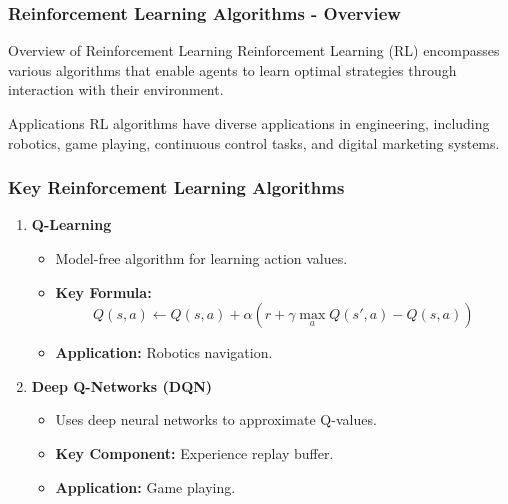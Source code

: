 \documentclass[aspectratio=169]{beamer}
\begin{document}
\begin{frame}[fragile]
    \frametitle{Reinforcement Learning Algorithms - Overview}
    \begin{block}{Overview of Reinforcement Learning}
        Reinforcement Learning (RL) encompasses various algorithms that enable agents to learn optimal strategies through interaction with their environment.
    \end{block}
    \begin{block}{Applications}
        RL algorithms have diverse applications in engineering, including robotics, game playing, continuous control tasks, and digital marketing systems.
    \end{block}
\end{frame}

\begin{frame}[fragile]
    \frametitle{Key Reinforcement Learning Algorithms}
    \begin{enumerate}
        \item \textbf{Q-Learning}
            \begin{itemize}
                \item Model-free algorithm for learning action values.
                \item \textbf{Key Formula:}
                \begin{equation}
                    Q(s, a) \leftarrow Q(s, a) + \alpha \left( r + \gamma \max_{a} Q(s', a) - Q(s, a) \right)
                \end{equation}
                \item \textbf{Application:} Robotics navigation.
            \end{itemize}
        
        \item \textbf{Deep Q-Networks (DQN)}
            \begin{itemize}
                \item Uses deep neural networks to approximate Q-values.
                \item \textbf{Key Component:} Experience replay buffer.
                \item \textbf{Application:} Game playing.
            \end{itemize}
    \end{enumerate}
\end{frame}
\end{document}
